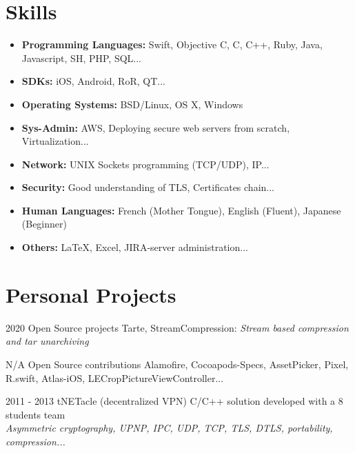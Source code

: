 \documentclass[]{template/friggeri-cv} %
\begin{document}

\section{Skills}

\begin{itemize}
\item \textbf{Programming Languages:} Swift, Objective C, C, C++, Ruby, Java, Javascript, SH, PHP, SQL...
\item \textbf{SDKs:} iOS, Android, RoR, QT...
\item \textbf{Operating Systems:} BSD/Linux, OS X, Windows
\item \textbf{Sys-Admin:} AWS, Deploying secure web servers from scratch, Virtualization...
\item \textbf{Network:} UNIX Sockets programming (TCP/UDP), IP...
\item \textbf{Security:} Good understanding of TLS, Certificates chain...
\item \textbf{Human Languages:} French (Mother Tongue), English (Fluent), Japanese (Beginner)
\item \textbf{Others:} \LaTeX, Excel, JIRA-server administration...
\end{itemize}


\section{Personal Projects}
\begin{entrylist}

\entry
{2020}
{Open Source projects}
{}
{Tarte, StreamCompression: \emph{Stream based compression and tar unarchiving}}


\entry
{N/A}
{Open Source contributions}
{}
{Alamofire, Cocoapods-Specs, AssetPicker, Pixel,  R.swift, Atlas-iOS, LECropPictureViewController...}


  \entry
      {2011 - 2013}
      {tNETacle (decentralized VPN)}
      {}
      {C/C++ solution developed with a 8 students team \\
      \emph{Asymmetric cryptography, UPNP, IPC, UDP, TCP, TLS, DTLS, portability, compression...}}


\end{entrylist}
\end{document}
